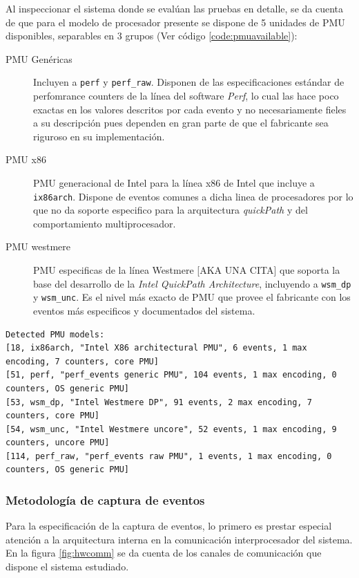 Al inspeccionar el sistema donde se evalúan las pruebas en detalle, se da cuenta de que para el modelo de procesador presente se dispone de 5 unidades de PMU disponibles, separables en 3 grupos (Ver código \ref{code:pmuavailable}):
\begin{description}
\item[PMU Genéricas] Incluyen a \verb=perf= y  \verb=perf_raw=. Disponen de las especificaciones estándar de perfomrance counters de la línea del software \emph{Perf}, lo cual las hace poco exactas en los valores descritos por cada evento y no necesariamente fieles a su descripción pues dependen en gran parte de que el fabricante sea riguroso en su implementación.
\item[PMU x86] PMU generacional de Intel para la línea x86 de Intel que incluye a \verb=ix86arch=. Dispone de eventos comunes a dicha linea de procesadores por lo que no da soporte especifico para la arquitectura \emph{quickPath} y del comportamiento multiprocesador.
\item[PMU westmere] PMU especificas de la línea Westmere [AKA UNA CITA] que soporta la base del desarrollo de la \emph{Intel QuickPath Architecture}, incluyendo a \verb=wsm_dp= y \verb=wsm_unc=. Es el nivel más exacto de PMU que provee el fabricante con los eventos más especificos y documentados del sistema.
\end{description}

\begin{lstlisting}[style=BashInputStyle, label={code:pmuavailable}, caption={Listado de \emph{PMUs} disponibles en el sistema, recuperado con la herramienta \emph{libpfm4}.}, captionpos=b]
	Detected PMU models:
[18, ix86arch, "Intel X86 architectural PMU", 6 events, 1 max encoding, 7 counters, core PMU]
[51, perf, "perf_events generic PMU", 104 events, 1 max encoding, 0 counters, OS generic PMU]
[53, wsm_dp, "Intel Westmere DP", 91 events, 2 max encoding, 7 counters, core PMU]
[54, wsm_unc, "Intel Westmere uncore", 52 events, 1 max encoding, 9 counters, uncore PMU]
[114, perf_raw, "perf_events raw PMU", 1 events, 1 max encoding, 0 counters, OS generic PMU]
\end{lstlisting}

\subsubsection{Metodología de captura de eventos}
Para la especificación de la captura de eventos, lo primero es prestar especial atención a la arquitectura interna en la comunicación interprocesador del sistema. En la figura \ref{fig:hwcomm} se da cuenta de los canales de comunicación que dispone el sistema estudiado.

